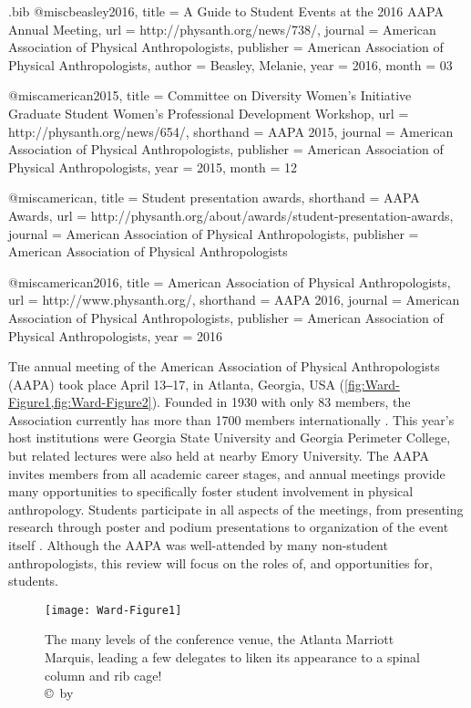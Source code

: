 \begin{filecontents}{\IJSRAidentifier.bib}
@misc{beasley2016,
title = {A Guide to Student Events at the 2016 AAPA Annual Meeting},
url = {http://physanth.org/news/738/},
journal = {American Association of Physical Anthropologists},
publisher = {American Association of Physical Anthropologists},
author = {Beasley, Melanie},
year = {2016},
month = {03}
} 

@misc{american2015,
title = {Committee on Diversity Women's Initiative Graduate Student Women's Professional Development Workshop},
url = {http://physanth.org/news/654/},
shorthand = {AAPA 2015},
journal = {American Association of Physical Anthropologists},
publisher = {American Association of Physical Anthropologists},
year = {2015},
month = {12}
}

@misc{american,
title = {Student presentation awards},
shorthand = {AAPA Awards},
url = {http://physanth.org/about/awards/student-presentation-awards},
journal = {American Association of Physical Anthropologists},
publisher = {American Association of Physical Anthropologists}
}

@misc{american2016,
title = {American Association of Physical Anthropologists},
url = {http://www.physanth.org/},
shorthand = {AAPA 2016},
journal = {American Association of Physical Anthropologists},
publisher = {American Association of Physical Anthropologists},
year = {2016}
}
\end{filecontents}

%
\IJSRAopening%


\lettrine{T}he  annual meeting of the American Association of Physical Anthropologists (AAPA)
took place April 13‒17, in Atlanta, Georgia, USA (\cref{fig:Ward-Figure1,fig:Ward-Figure2}).
Founded in 1930 with only \num{83} members, the Association currently has more than \num{1700} members internationally \parencite{american2016}.
This year’s host institutions were Georgia State University and Georgia Perimeter College,
but related lectures were also held at nearby Emory University.
The AAPA invites members from all academic career stages, and annual meetings provide many opportunities to
specifically foster student involvement in physical anthropology.
Students participate in all aspects of the meetings, from presenting research through poster and
podium presentations to organization of the event itself \parencite{beasley2016}.
Although the AAPA was well-attended by many non-student anthropologists, this review will focus on the roles of,
and opportunities for, students.
\begin{figure}[!htb] %
		\centering
		\texttt{[image: Ward-Figure1]}
		\caption{The many levels of the conference venue, the Atlanta Marriott Marquis, leading a few delegates to liken its appearance to a spinal column and rib cage! 
		{\normalfont\scriptsize \\ \copyright\ by \authortwo}}
		\label{fig:Ward-Figure1}
	\end{figure}

